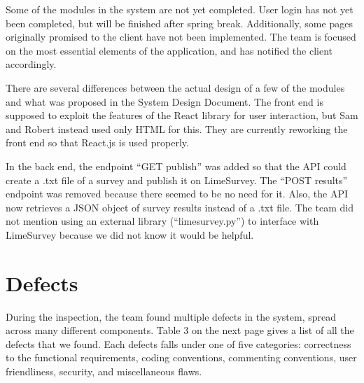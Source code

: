 \documentclass{article}
\begin{document}
\vspace{0.5cm}

Some of the modules in the system are not yet completed. User login has not yet been completed, but will be finished after spring break. Additionally, some pages originally promised to the client have not been implemented. The team is focused on the most essential elements of the application, and has notified the client accordingly. 

There are several differences between the actual design of a few of the modules and what was proposed in the System Design Document. The front end is supposed to exploit the features of the React library for user interaction, but Sam and Robert instead used only HTML for this. They are currently reworking the front end so that React.js is used properly.

In the back end, the endpoint ``GET publish'' was added so that the API could create a .txt file of a survey and publish it on LimeSurvey. The ``POST results'' endpoint was removed because there seemed to be no need for it. Also, the API now retrieves a JSON object of survey results instead of a .txt file. The team did not mention using an external library (``limesurvey.py'') to interface with LimeSurvey because we did not know it would be helpful.

\section{Defects}

During the inspection, the team found multiple defects in the system, spread across many different components. Table 3 on the next page gives a list of all the defects that we found. Each defects falls under one of five categories: correctness to the functional requirements, coding conventions, commenting conventions, user friendliness, security, and miscellaneous flaws.
\end{document}
